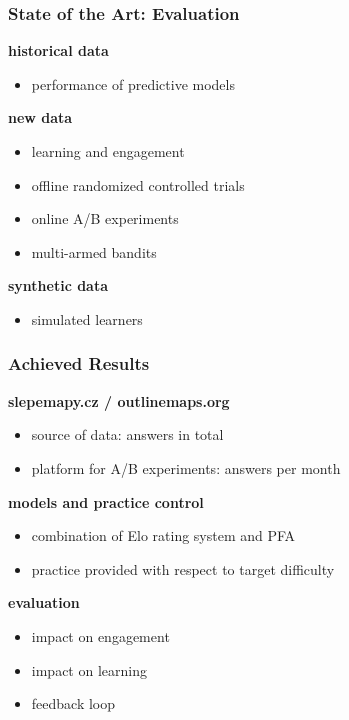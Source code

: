 \documentclass[xcolor=svgnames]{beamer}
\renewcommand{\cite}[1]{{\small\parencite{#1}}}
\begin{document}
\begin{frame}
	\frametitle{State of the Art: Evaluation}
	\textbf{historical data}
	\begin{itemize}
		\item performance of predictive models\\\cite{pelanek2014brief, huang2015framework}
	\end{itemize}
	\textbf{new data}
	\begin{itemize}
		\item learning and engagement
		\item offline randomized controlled trials~\cite{dimitrov2003pretest}
		\item online A/B experiments~\cite{stamper2012rise}
		\item multi-armed bandits~\cite{liu2014trading}
	\end{itemize}
	\textbf{synthetic data}
	\begin{itemize}
		\item simulated learners~\cite{fancsali2013optimal}
	\end{itemize}
\end{frame}
\begin{frame}
	\frametitle{Achieved Results}
	\textbf{slepemapy.cz / outlinemaps.org}
	\begin{itemize}
		\item source of data:  answers in total
		\item platform for A/B experiments:  answers per month
	\end{itemize}
	\textbf{models and practice control}
	\begin{itemize}
		\item combination of Elo rating system and PFA
		\item practice provided with respect to target difficulty\\\cite{papousek2014adaptive}
	\end{itemize}
	\textbf{evaluation}
	\begin{itemize}
		\item impact on engagement~\cite{papousek2015impact}
		\item impact on learning~\cite{papousek2016evaluation}
		\item feedback loop~\cite{niznan2015exploring, pelanek2016impact}
	\end{itemize}
\end{frame}
\end{document}
